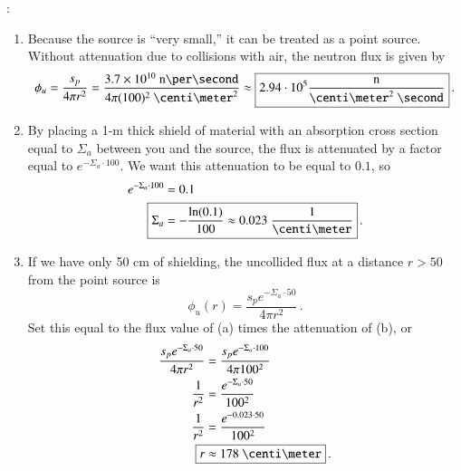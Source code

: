 \vspace{0.5cm}
\ifsolved
{
\color{purple}

:


\begin{enumerate}[label=(\alph*)]
\item
Because the source is ``very small,'' it can be treated as a point source.  Without attenuation due to collisions with air, the neutron flux is given by
\begin{equation*}
 \phi_u = \frac{s_p}{4\pi r^2} = \frac{3.7\times 10^{10}~\text{n}\per\second}{4\pi (100)^2~\centi\meter^2}
 \approx \boxed{2.94 \cdot 10^{5} \frac{\text{n}}{\centi\meter^2~\second}} \, .
\end{equation*}
\item By placing a 1-m thick shield of material with an absorption cross section equal to $\Sigma_a$ between you and the source, the flux is attenuated by a factor equal to $e^{-\Sigma_a\cdot 100}$.  We want this attenuation to be equal to $0.1$, so
\begin{align*}
  e^{-\Sigma_a\cdot 100} &= 0.1 \\
  \Aboxed{\Sigma_a  &= -\frac{\ln(0.1)}{100} \approx 0.023~\frac{1}{\centi\meter}} \, .
\end{align*}
\item If we have only 50 cm of shielding, the uncollided flux at a distance $r > 50$ from the point source is
\begin{equation*}
 \phi_u(r) = \frac{s_p e^{-\Sigma_a \cdot 50}}{4\pi r^2}  \, .
\end{equation*}
Set this equal to the flux value of (a) times the attenuation of (b), or
\begin{align*}
 \frac{s_p e^{-\Sigma_a \cdot 50}}{4\pi r^2} &= \frac{s_p e^{-\Sigma_a \cdot 100}}{4\pi 100^2} \\
 \frac{1}{r^2} &= \frac{e^{-\Sigma_a \cdot 50}}{100^2} \\
 \frac{1}{r^2} &= \frac{e^{-0.023 \cdot 50}}{100^2} \\
 \Aboxed{r &\approx 178~\centi\meter} \, .
\end{align*}


\end{enumerate}

}
\newpage
\else
\fi




